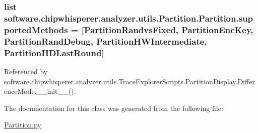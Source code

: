 \subsubsection[{supported\+Methods}]{\setlength{\rightskip}{0pt plus 5cm}list software.\+chipwhisperer.\+analyzer.\+utils.\+Partition.\+Partition.\+supported\+Methods = \mbox{[}{\bf Partition\+Randvs\+Fixed}, {\bf Partition\+Enc\+Key}, {\bf Partition\+Rand\+Debug}, {\bf Partition\+H\+W\+Intermediate}, {\bf Partition\+H\+D\+Last\+Round}\mbox{]}\hspace{0.3cm}{\ttfamily [static]}}\label{classsoftware_1_1chipwhisperer_1_1analyzer_1_1utils_1_1Partition_1_1Partition_ae5d930fd343377de83dad6da6a82b514}


Referenced by software.\+chipwhisperer.\+analyzer.\+utils.\+Trace\+Explorer\+Scripts.\+Partition\+Display.\+Difference\+Mode.\+\_\+\+\_\+init\+\_\+\+\_\+().



The documentation for this class was generated from the following file\+:\begin{DoxyCompactItemize}
\item 
\hyperlink{Partition_8py}{Partition.\+py}\end{DoxyCompactItemize}
